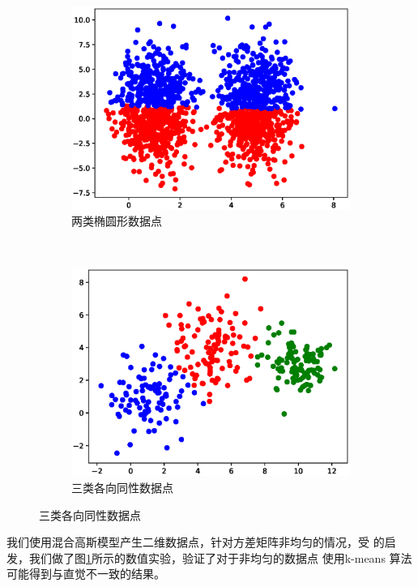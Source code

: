 \documentclass{ctexart}
\theoremstyle{definition}
\theoremstyle{remark}
\begin{document}
\begin{figure}[!ht]
    \centering
    \begin{subfigure}[b]{0.45\textwidth}
    \includegraphics[width=\textwidth]{uneven.eps}
    \caption{两类椭圆形数据点}\label{fig:kmeans_wrong}
    \end{subfigure}~
    \begin{subfigure}[b]{0.45\textwidth}
    \includegraphics[width=\textwidth]{even.eps}
    \caption{三类各向同性数据点}\label{fig:kmeans_right}
    \end{subfigure}
\end{figure}

我们使用混合高斯模型产生二维数据点，针对方差矩阵非均匀的情况，受\cite{kmeans-bad} 的启发，我们做了图\ref{fig:kmeans_wrong}所示的数值实验，验证了对于非均匀的数据点
使用k-means 算法可能得到与直觉不一致的结果。
\end{document}
